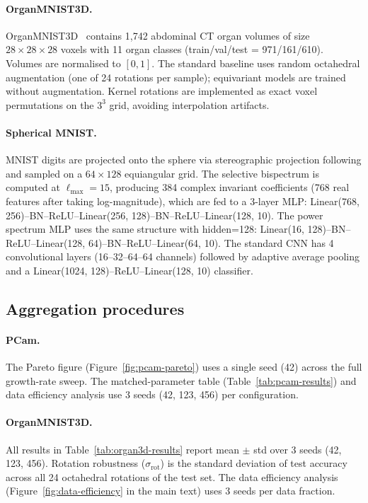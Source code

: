 \documentclass{article}
\theoremstyle{definition}
\theoremstyle{remark}
\theoremstyle{definition}
\begin{document}
\paragraph{OrganMNIST3D.}
OrganMNIST3D~\citep{medmnistv2} contains 1{,}742 abdominal CT organ
volumes of size $28 \times 28 \times 28$ voxels with 11 organ classes
(train/val/test = 971/161/610). Volumes are normalised to $[0, 1]$.
The standard baseline uses random octahedral augmentation (one of 24
rotations per sample); equivariant models are trained without
augmentation. Kernel rotations are implemented as exact voxel
permutations on the $3^3$ grid, avoiding interpolation artifacts.

\paragraph{Spherical MNIST.}
MNIST digits are projected onto the sphere via stereographic
projection following \citet{cohen2018spherical} and sampled on a
$64 \times 128$ equiangular grid. The selective bispectrum is
computed at $\ell_{\max} = 15$, producing 384 complex invariant
coefficients (768 real features after taking log-magnitude), which
are fed to a 3-layer MLP: Linear(768, 256)--BN--ReLU--Linear(256,
128)--BN--ReLU--Linear(128, 10). The power spectrum MLP uses the
same structure with hidden=128: Linear(16, 128)--BN--ReLU--Linear(128,
64)--BN--ReLU--Linear(64, 10). The standard CNN has 4 convolutional
layers (16--32--64--64 channels) followed by adaptive average pooling
and a Linear(1024, 128)--ReLU--Linear(128, 10) classifier.

\subsection{Aggregation procedures}

\paragraph{PCam.}
The Pareto figure (Figure~\ref{fig:pcam-pareto}) uses a single seed
(42) across the full growth-rate sweep. The matched-parameter table
(Table~\ref{tab:pcam-results}) and data efficiency analysis use 3 seeds
(42, 123, 456) per configuration.

\paragraph{OrganMNIST3D.}
All results in Table~\ref{tab:organ3d-results} report mean $\pm$ std
over 3 seeds (42, 123, 456). Rotation robustness
($\sigma_{\mathrm{rot}}$) is the standard deviation of test accuracy
across all 24 octahedral rotations of the test set. The data
efficiency analysis (Figure~\ref{fig:data-efficiency} in the main text) uses 3 seeds per data
fraction.
\end{document}
